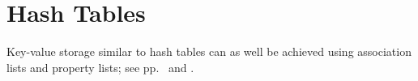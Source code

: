 %
%

\section{Hash Tables} 
Key-value storage similar to hash tables can as well be achieved using
association lists and property lists; see
pp.\ \pageref{section:Association Lists} and \pageref{:property_lists}. 


